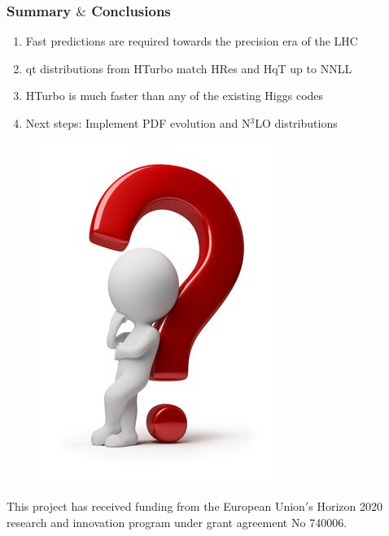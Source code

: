 \documentclass[aspectratio=43]{beamer}
\begin{document}
\begin{frame}
	
	\frametitle{Summary $\&$ Conclusions}

	\vspace{2.0 cm}
	
	\begin{enumerate}
		\item Fast predictions are required towards the precision era of the LHC
		\item qt distributions from HTurbo {\color{blue}match HRes and HqT up to NNLL}
		\item HTurbo is {\color{blue}much faster than any of the existing Higgs codes}
		\item Next steps: Implement PDF evolution and {\color{blue}N$^{3}$LO distributions}

	\end{enumerate}

	\vspace{2.0 cm}

\end{frame}

\begin{frame}


	\begin{figure}
		\includegraphics[width = 4 cm]{plots/thinking.png}
	\end{figure}		


{\small \color{blue} This project has received funding from the European Union$'$s Horizon 2020 research and innovation program under grant agreement No 740006.}

\end{frame}
\end{document}
